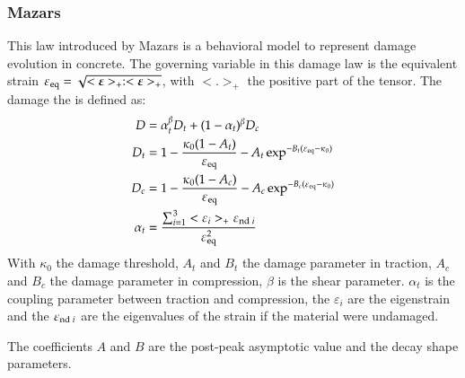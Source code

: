 \subsubsection{Mazars}
This law introduced by Mazars \cite{mazars84a} is a behavioral model to
represent damage evolution in concrete. The governing variable in this damage
law is the equivalent strain $\varepsilon_{{\mathrm{eq}}} =
\sqrt{<\boldsymbol{\varepsilon}>_+:<\boldsymbol{\varepsilon}>_+}$, with $<.>_+$ the positive
part of the tensor.
The damage the is defined as:
\begin{align}
  D &= \alpha_t^\beta D_t + (1-\alpha_t)^\beta D_c\\
  D_t &= 1 - \frac{\kappa_0 (1- A_t)}{\varepsilon_{{\mathrm{eq}}}} - A_t \exp^{-B_t(\varepsilon_{{\mathrm{eq}}}-\kappa_0)}\\
  D_c &= 1 - \frac{\kappa_0 (1- A_c)}{\varepsilon_{{\mathrm{eq}}}} - A_c
  \exp^{-B_c(\varepsilon_{{\mathrm{eq}}}-\kappa_0)}\\
  \alpha_t &= \frac{\sum_{i=1}^3<\varepsilon_i>_+\varepsilon_{{\mathrm{nd}}\;i}}{\varepsilon_{{\mathrm{eq}}}^2}
\end{align}
With $\kappa_0$ the damage threshold, $A_t$ and $B_t$ the damage parameter in
traction, $A_c$ and $B_c$ the damage parameter in compression, $\beta$ is the
shear parameter. $\alpha_t$ is the coupling parameter between traction and
compression, the $\varepsilon_i$ are the eigenstrain and the
$\varepsilon_{{\mathrm{nd}}\;i}$ are the eigenvalues of the strain if the material
were undamaged.

The coefficients $A$ and $B$ are the post-peak asymptotic
value and the decay shape parameters.





